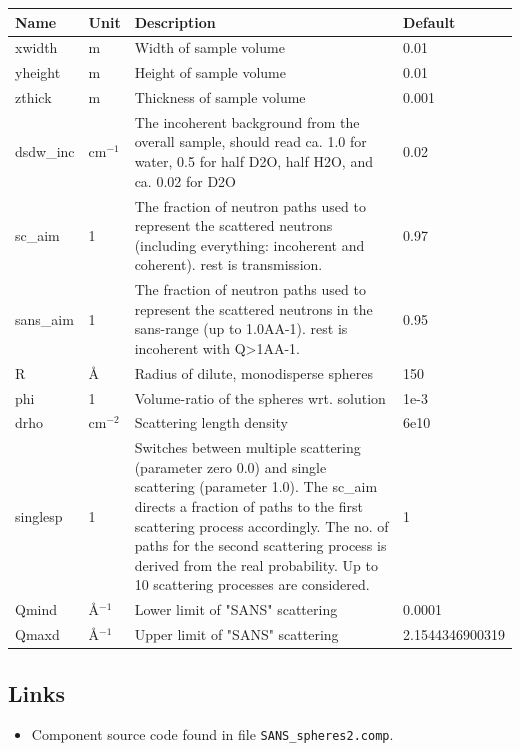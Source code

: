 \begin{longtable}{p{}p{}p{}p{}}
\toprule
\textbf{Name} & \textbf{Unit} & \textbf{Description} & \textbf{Default} \\
\midrule
\endhead
xwidth & m & Width of sample volume & 0.01 \\
yheight & m & Height of sample volume & 0.01 \\
zthick & m & Thickness of sample volume & 0.001 \\
dsdw\_inc & cm$^{-1}$ & The incoherent background from the overall sample, should read ca. 1.0 for water, 0.5 for half D2O, half H2O, and ca. 0.02 for D2O & 0.02 \\
sc\_aim & 1 & The fraction of neutron paths used to represent the scattered neutrons (including everything: incoherent and coherent). rest is transmission. & 0.97 \\
sans\_aim & 1 & The fraction of neutron paths used to represent the scattered neutrons in the sans-range (up to 1.0AA-1). rest is incoherent with Q\textgreater{}1AA-1. & 0.95 \\
R & \AA{} & Radius of dilute, monodisperse spheres & 150 \\
phi & 1 & Volume-ratio of the spheres wrt. solution & 1e-3 \\
drho & cm$^{-2}$ & Scattering length density & 6e10 \\
singlesp & 1 & Switches between multiple scattering (parameter zero 0.0) and single scattering (parameter 1.0). The sc\_aim directs a fraction of paths to the first scattering process accordingly. The no. of paths for the second scattering process is derived from the real probability. Up to 10 scattering processes are considered. & 1 \\
Qmind & \AA{}$^{-1}$ & Lower limit of "SANS" scattering & 0.0001 \\
Qmaxd & \AA{}$^{-1}$ & Upper limit of "SANS" scattering & 2.1544346900319 \\
\bottomrule
\end{longtable}

\subsection*{Links}
\begin{itemize}
  \item Component source code found in file \texttt{SANS\_spheres2.comp}.
\end{itemize}
